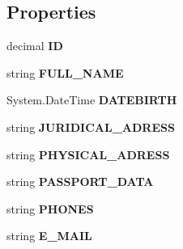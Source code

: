\subsection*{Properties}
\begin{CompactItemize}
\item 
decimal \textbf{ID}\hspace{0.3cm}{\tt  [get, set]}\label{class_automatic_medical_system_1_1_data_set2_1_1_d_o_c_t_o_r_s_row_a92faadeec42144b8af2df58f33da3dd}

\item 
string \textbf{FULL\_\-NAME}\hspace{0.3cm}{\tt  [get, set]}\label{class_automatic_medical_system_1_1_data_set2_1_1_d_o_c_t_o_r_s_row_af8640432f9e246b4e119f78e7455bc7}

\item 
System.DateTime \textbf{DATEBIRTH}\hspace{0.3cm}{\tt  [get, set]}\label{class_automatic_medical_system_1_1_data_set2_1_1_d_o_c_t_o_r_s_row_a9d22480ed97ae89d600370c9aa04ffa}

\item 
string \textbf{JURIDICAL\_\-ADRESS}\hspace{0.3cm}{\tt  [get, set]}\label{class_automatic_medical_system_1_1_data_set2_1_1_d_o_c_t_o_r_s_row_b9bf79e26e245dbabde8dcc2aa0b05af}

\item 
string \textbf{PHYSICAL\_\-ADRESS}\hspace{0.3cm}{\tt  [get, set]}\label{class_automatic_medical_system_1_1_data_set2_1_1_d_o_c_t_o_r_s_row_e771eb81657909fa940f02d5402aa9b3}

\item 
string \textbf{PASSPORT\_\-DATA}\hspace{0.3cm}{\tt  [get, set]}\label{class_automatic_medical_system_1_1_data_set2_1_1_d_o_c_t_o_r_s_row_285f8c2fb62d5f768b0fc7be5bb4817e}

\item 
string \textbf{PHONES}\hspace{0.3cm}{\tt  [get, set]}\label{class_automatic_medical_system_1_1_data_set2_1_1_d_o_c_t_o_r_s_row_042dcc31ad391d66a20941527038449f}

\item 
string \textbf{E\_\-MAIL}\hspace{0.3cm}{\tt  [get, set]}\label{class_automatic_medical_system_1_1_data_set2_1_1_d_o_c_t_o_r_s_row_b941a0fa3a0c5966e975c24b33b3b755}


\end{CompactItemize}

